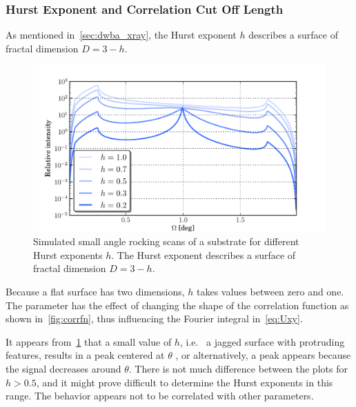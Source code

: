 \documentclass[10pt,twoside, b5paper,pdftex]{report}
\begin{document}
\subsubsection{Hurst Exponent and Correlation Cut Off Length \label{sec:lastlabel}}
As mentioned in~\cref{sec:dwba_xray}, the Hurst exponent $h$ describes a surface of fractal dimension $D = 3 - h$. 
\begin{figure}[htbp]
	\begin{center}
		\includegraphics[width=1.0\textwidth]{figures/var_hurst.pdf}
	\end{center}
	\caption{Simulated small angle rocking scans of a substrate for different Hurst exponents $h$. The Hurst exponent describes a surface of fractal dimension $D = 3 - h$.  \label{fig:var_hurst}}
\end{figure}
Because a flat surface has two dimensions, $h$ takes values between zero and one. The parameter has the effect of changing the shape of the correlation function as shown in~\cref{fig:corrfn}, thus influencing the Fourier integral in~\cref{eq:Uxy}.

It appears from~\cref{fig:var_hurst} that a small value of $h$, i.e.~ a jagged surface with protruding features, results in a peak centered at $\theta$ , or alternatively,  a peak appears because the signal decreases around $\theta$. There is not much difference between the plots for $h > 0.5$, and it might prove difficult to determine the Hurst exponents in this range. The behavior appears not to be correlated with other parameters. 
 
\end{document}
